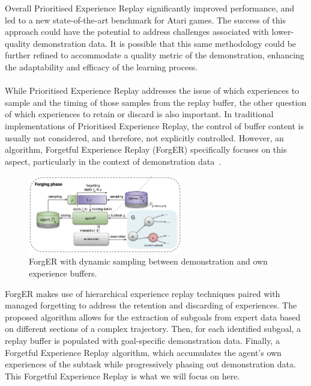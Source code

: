 Overall Prioritised Experience Replay significantly improved performance, and led to a new state-of-the-art benchmark for Atari games.
The success of this approach could have the potential to address challenges associated with lower-quality demonstration data.
It is possible that this same methodology could be further refined to accommodate a quality metric of the demonstration, enhancing the adaptability and efficacy of the learning process. \\\\



While Prioritised Experience Replay addresses the issue of which experiences to sample and the timing of those samples from the replay buffer, the other question of which experiences to retain or discard is also important. 
In traditional implementations of Prioritised Experience Replay, the control of buffer content is usually not considered, and therefore, not explicitly controlled. 
However, an algorithm, Forgetful Experience Replay (ForgER) specifically focuses on this aspect, particularly in the context of demonstration data~\cite{fyp16-forgetful-experience-replay}.

\begin{figure}[htbp]
  \centering
  \includegraphics[width=0.6\textwidth]{background/fyp16-forger-arch.png}
  \caption{ForgER with dynamic sampling between demonstration and own experience buffers.}
\label{fig:fyp16-forger-arch}
\end{figure}

ForgER makes use of hierarchical experience replay techniques paired with managed forgetting to address the retention and discarding of experiences. 
The proposed algorithm allows for the extraction of subgoals from expert data based on different sections of a complex trajectory. 
Then, for each identified subgoal, a replay buffer is populated with goal-specific demonstration data. 
Finally, a Forgetful Experience Replay algorithm, which accumulates the agent's own experiences of the subtask while progressively phasing out demonstration data.
This Forgetful Experience Replay is what we will focus on here.

